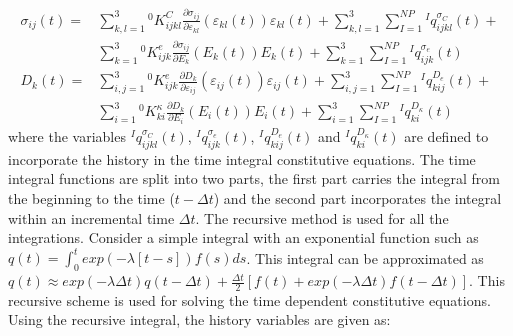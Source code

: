 \begin{equation}
\begin{aligned}
\sigma_{ij}(t)=
&\sum_{k,l=1}^{3}  
{}^{0}K_{ijkl}^{C} 
\frac{\partial \sigma_{ij}}{\partial \varepsilon_{kl}}(\varepsilon_{kl}(t))\varepsilon_{kl}(t)+
\sum_{k,l=1}^{3} 
\sum_{I=1}^{NP}
{}^{I}q_{ijkl}^{\sigma_C}(t) + \\
&
\sum_{k=1}^{3}
{}^{0}K_{ijk}^{e}\frac{\partial \sigma_{ij}}{\partial E_{k}}(E_{k} (t)) E_{k} (t)+ 
\sum_{k=1}^{3} 
\sum_{I=1}^{NP}{}^{I}q_{ijk}^{\sigma_e}(t)\\
D_k(t)=
&\sum_{i,j=1}^{3}
{}^{0}K_{ijk}^{e}\frac{\partial D_{k}}{\partial \varepsilon_{ij}}(\varepsilon_{ij}(t)) \varepsilon_{ij}(t)+
\sum_{i,j=1}^{3}
\sum_{I=1}^{NP}{}^{I}q_{kij}^{D_e}(t) +\\
&
\sum_{i=1}^{3}
{}^{0} K_{ki}^{\kappa}\frac{\partial D_{k}}{\partial E_{i}}(E_{i} (t)) E_{i} (t)+ 
\sum_{i=1}^{3}
\sum_{I=1}^{NP}
{}^{I}q_{ki}^{D_{\kappa}}(t)
\end{aligned}
\label{EQN:History_Introduction}
\end{equation}
where the variables ${}^{I}q_{ijkl}^{\sigma_C}(t) $, ${}^{I}q_{ijk}^{\sigma_e}(t)$, ${}^{I}q_{kij}^{D_e}(t)$ and ${}^{I}q_{ki}^{D_{\kappa}}(t)$ are defined to incorporate the history in the time integral constitutive equations. 
The time integral functions are split into two parts, the first part carries the integral from the beginning to the time ($t-\Delta t$) and the second part incorporates the integral within an incremental time $\Delta t$. 
The recursive method is used for all the integrations. 
Consider a simple integral with an exponential function such as $q(t)=\int_0^t exp(-\lambda [t-s])f(s)ds$.
This integral can be approximated as $q(t)\approx exp(-\lambda\Delta t) q(t-\Delta t) +\frac{\Delta t}{2} [f(t)+exp(-\lambda \Delta t ) f(t-\Delta t)]$.
This recursive scheme is used for solving the time dependent constitutive equations. 
Using the recursive integral, the history variables are given as:   

